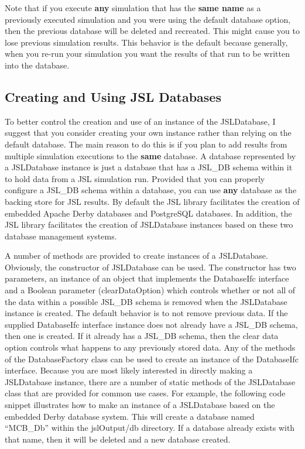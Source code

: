 \documentclass[
]{book}
\theoremstyle{definition}
\theoremstyle{definition}
\theoremstyle{definition}
\theoremstyle{definition}
\theoremstyle{remark}
\begin{document}
Note that if you execute \textbf{any} simulation that has the \textbf{same name}
as a previously executed simulation and you were using the default
database option, then the previous database will be deleted and
recreated. This might cause you to lose previous simulation results.
This behavior is the default because generally, when you re-run your
simulation you want the results of that run to be written into the
database.

\hypertarget{creating-and-using-jsl-databases}{%
\subsection{Creating and Using JSL Databases}\label{creating-and-using-jsl-databases}}

To better control the creation and use of an instance of the
JSLDatabase, I suggest that you consider creating your own instance
rather than relying on the default database. The main reason to do this
is if you plan to add results from multiple simulation executions to the
\textbf{same} database. A database represented by a JSLDatabase instance is
just a database that has a JSL\_DB schema within it to hold data from a
JSL simulation run. Provided that you can properly configure a JSL\_DB
schema within a database, you can use \textbf{any} database as the backing
store for JSL results. By default the JSL library facilitates the
creation of embedded Apache Derby databases and PostgreSQL databases. In
addition, the JSL library facilitates the creation of JSLDatabase
instances based on these two database management systems.

A number of methods are provided to create instances of a JSLDatabase.
Obviously, the constructor of JSLDatabase can be used. The constructor
has two parameters, an instance of an object that implements the
DatabaseIfc interface and a Boolean parameter (clearDataOption) which
controls whether or not all of the data within a possible JSL\_DB schema
is removed when the JSLDatabase instance is created. The default
behavior is to not remove previous data. If the supplied DatabaseIfc
interface instance does not already have a JSL\_DB schema, then one is
created. If it already has a JSL\_DB schema, then the clear data option
controls what happens to any previously stored data. Any of the methods
of the DatabaseFactory class can be used to create an instance of the
DatabaseIfc interface. Because you are most likely interested in
directly making a JSLDatabase instance, there are a number of static
methods of the JSLDatabase class that are provided for common use cases.
For example, the following code snippet illustrates how to make an
instance of a JSLDatabase based on the embedded Derby database system.
This will create a database named ``MCB\_Db'' within the jslOutput/db
directory. If a database already exists with that name, then it will be
deleted and a new database created.
\end{document}
